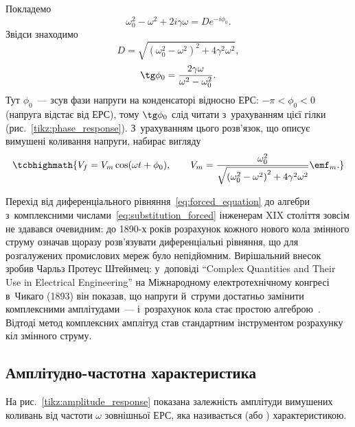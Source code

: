 Покладемо
\begin{equation*}
	\omega_0^2 - \omega^2 + 2i\gamma\omega = D e^{-i\phi_0}.
\end{equation*}
Звідси знаходимо
\begin{equation}\label{eq:rho_phi}
	D = \sqrt{\left(\omega_0^2 - \omega^2\right)^2 + 4\gamma^2\omega^2},
\end{equation}
\begin{equation*}
	\tg\phi_0 = \frac{2\gamma\omega}{\omega^2 - \omega_0^2}.
\end{equation*}
Тут $\phi_0$~--- зсув фази напруги на конденсаторі відносно ЕРС: $-\pi<\phi_0<0$ (напруга відстає від ЕРС), тому $\tg\phi_0$ слід читати з~урахуванням цієї гілки (рис.~\ref{tikz:phase_response}). З~урахуванням цього розв'язок, що описує вимушені коливання напруги, набирає вигляду
\begin{equation}\label{eq:forced_voltage}
	\tcbhighmath{
		V_f = V_m \cos(\omega t + \phi_0), \qquad
		V_m = \frac{\omega_0^2}{\sqrt{\left(\omega_0^2 - \omega^2\right)^2 + 4\gamma^2\omega^2}}\emf_m.
	}
\end{equation}

\begin{Historical}
	Перехід від диференціального рівняння~\eqref{eq:forced_equation} до алгебри з~комплексними числами~\eqref{eq:substitution_forced} інженерам XIX століття зовсім не здавався очевидним: до 1890-х років розрахунок кожного нового кола змінного струму означав щоразу розв'язувати диференціальні рівняння, що для розгалужених промислових мереж було непідйомним. Вирішальний внесок зробив Чарльз Протеус Штейнмец: у~доповіді \enquote{Complex Quantities and Their Use in Electrical Engineering} на Міжнародному електротехнічному конгресі в~Чикаго (1893) він показав, що напруги й~струми достатньо замінити комплексними амплітудами~--- і~розрахунок кола стає простою алгеброю~\cite{Steinmetz1893}. Відтоді метод комплексних амплітуд став стандартним інструментом розрахунку кіл змінного струму.
\end{Historical}

\subsection*{Амплітудно-частотна характеристика}

На рис.~\ref{tikz:amplitude_response} показана залежність амплітуди вимушених коливань від частоти $\omega$ зовнішньої ЕРС, яка називається  (або ) характеристикою.

